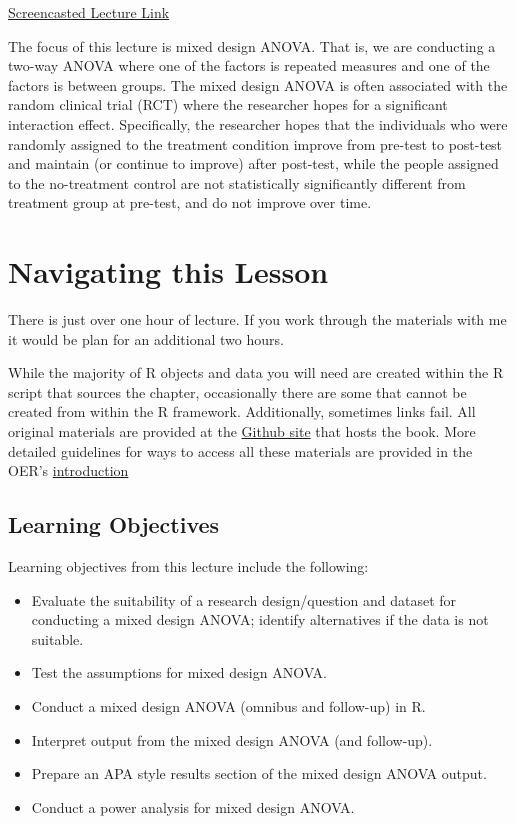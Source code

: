 \documentclass[
  11pt,
]{book}
\providecommand{\tightlist}{%
  \setlength{\itemsep}{0pt}\setlength{\parskip}{0pt}}
\begin{document}
\href{https://spu.hosted.panopto.com/Panopto/Pages/Viewer.aspx?pid=b08debbb-948e-4f25-923a-ad8c01037e05}{Screencasted Lecture Link}

The focus of this lecture is mixed design ANOVA. That is, we are conducting a two-way ANOVA where one of the factors is repeated measures and one of the factors is between groups. The mixed design ANOVA is often associated with the random clinical trial (RCT) where the researcher hopes for a significant interaction effect. Specifically, the researcher hopes that the individuals who were randomly assigned to the treatment condition improve from pre-test to post-test and maintain (or continue to improve) after post-test, while the people assigned to the no-treatment control are not statistically significantly different from treatment group at pre-test, and do not improve over time.

\hypertarget{navigating-this-lesson-8}{%
\section{Navigating this Lesson}\label{navigating-this-lesson-8}}

There is just over one hour of lecture. If you work through the materials with me it would be plan for an additional two hours.

While the majority of R objects and data you will need are created within the R script that sources the chapter, occasionally there are some that cannot be created from within the R framework. Additionally, sometimes links fail. All original materials are provided at the \href{https://github.com/lhbikos/ReCenterPsychStats}{Github site} that hosts the book. More detailed guidelines for ways to access all these materials are provided in the OER's \protect\hyperlink{ReCintro}{introduction}

\hypertarget{learning-objectives-8}{%
\subsection{Learning Objectives}\label{learning-objectives-8}}

Learning objectives from this lecture include the following:

\begin{itemize}
\tightlist
\item
  Evaluate the suitability of a research design/question and dataset for conducting a mixed design ANOVA; identify alternatives if the data is not suitable.
\item
  Test the assumptions for mixed design ANOVA.
\item
  Conduct a mixed design ANOVA (omnibus and follow-up) in R.
\item
  Interpret output from the mixed design ANOVA (and follow-up).
\item
  Prepare an APA style results section of the mixed design ANOVA output.
\item
  Conduct a power analysis for mixed design ANOVA.
\end{itemize}
\end{document}
